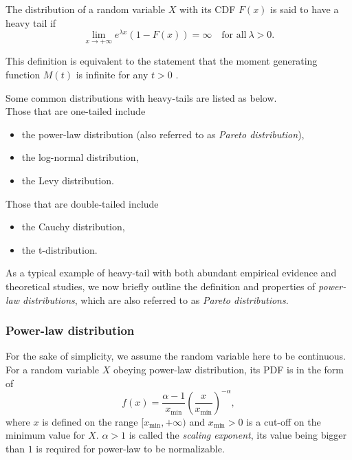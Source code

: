 \begin{defn}
The distribution of a random variable $ X $ with its CDF $ F(x) $ is said to have a heavy tail if 
\begin{equation}
\lim_{x \rightarrow +\infty} e^{\lambda x} (1-F(x)) = \infty \quad \text{for all} \ \lambda > 0.
\end{equation}
\end{defn}
This definition is equivalent to the statement that the moment generating function $ M(t) $ is infinite for any $ t>0 $ \cite{rolski2009stochastic}. 

Some common distributions with heavy-tails are listed as below.\\
Those that are one-tailed include
\begin{itemize}
\item the power-law distribution (also referred to as \textit{Pareto distribution}),
\item the log-normal distribution,
\item the Levy distribution.
\end{itemize}
Those that are double-tailed include
\begin{itemize}
\item the Cauchy distribution,
\item the t-distribution.
\end{itemize}

As a typical example of heavy-tail with both abundant empirical evidence and theoretical studies, we now briefly outline the definition and properties of \textit{power-law distributions}, which are also referred to as \textit{Pareto distributions}. 

\subsubsection{Power-law distribution}
For the sake of simplicity, we assume the random variable here to be continuous. For a random variable $ X $ obeying power-law distribution, its PDF is in the form of
\begin{equation}
f(x) = \frac{\alpha -1}{x_{\min}} (\frac{x}{x_{\min}})^{-\alpha}, 
\end{equation}
where $ x $ is defined on the range $ [x_{\min}, +\infty) $ and $ x_{\min}>0 $ is a cut-off on the minimum value for $ X $. $ \alpha>1  $ is called the \textit{scaling exponent}, its value being bigger than $ 1 $ is required for power-law to be normalizable.

